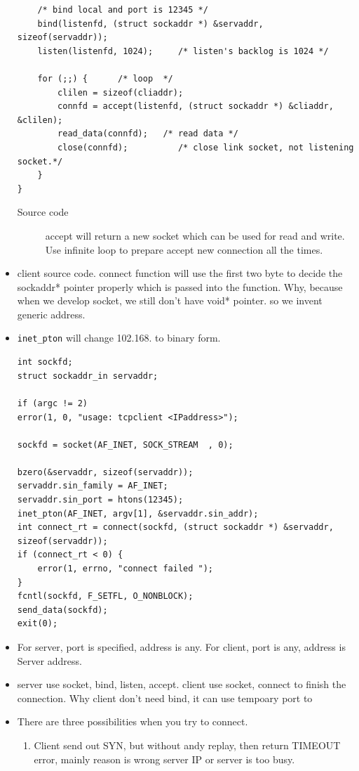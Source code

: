 \documentclass[a4paper,11pt,twoside]{book}
\begin{document}
\begin{itemize}
\begin{lstlisting}
	/* bind local and port is 12345 */
	bind(listenfd, (struct sockaddr *) &servaddr, sizeof(servaddr));
	listen(listenfd, 1024); 	/* listen's backlog is 1024 */

	for (;;) {  	/* loop  */
		clilen = sizeof(cliaddr);
		connfd = accept(listenfd, (struct sockaddr *) &cliaddr, &clilen);
		read_data(connfd);   /* read data */
		close(connfd);          /* close link socket, not listening socket.*/
	}
}
\end{lstlisting}
\begin{description}
	\item[Source code] accept will return a new socket which can be used for read and write. Use infinite loop to prepare accept new connection all the times. 
\end{description}

	\item  client source code.  connect function will use the first two byte to decide the sockaddr* pointer properly which is passed into the function. Why, because when we develop socket, we still don't have void* pointer. so we invent generic address. 

	\item  \texttt{inet\_pton} will change 102.168. to binary form. 
\begin{lstlisting}
int sockfd;
struct sockaddr_in servaddr;

if (argc != 2)
error(1, 0, "usage: tcpclient <IPaddress>");

sockfd = socket(AF_INET, SOCK_STREAM  , 0);

bzero(&servaddr, sizeof(servaddr));
servaddr.sin_family = AF_INET;
servaddr.sin_port = htons(12345);
inet_pton(AF_INET, argv[1], &servaddr.sin_addr);
int connect_rt = connect(sockfd, (struct sockaddr *) &servaddr, sizeof(servaddr));
if (connect_rt < 0) {
	error(1, errno, "connect failed ");
}
fcntl(sockfd, F_SETFL, O_NONBLOCK); 
send_data(sockfd);
exit(0);                           
\end{lstlisting}

\item For server, port is specified, address is any. For client, port is any, address is Server address.
	
		\item server use socket, bind, listen, accept. client use socket, connect to finish the connection. Why client don't need bind, it can use tempoary port to 
	
	\item There are three possibilities when you try to connect.
	\begin{enumerate}
		\item Client send out SYN, but without andy replay, then return TIMEOUT error, mainly reason is wrong server IP or server is too busy. 
		

\end{enumerate}
\end{itemize}
\end{document}
